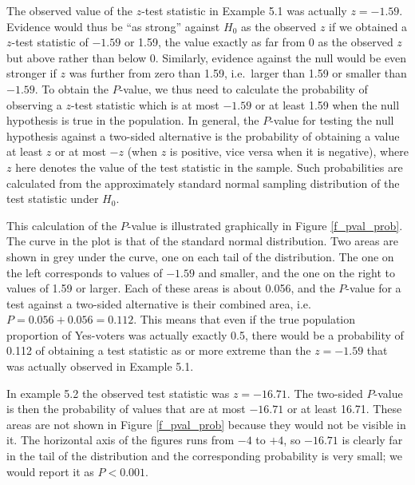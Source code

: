 The observed value of the $z$-test statistic in Example 5.1 was actually
$z=-1.59$. Evidence would thus be ``as strong'' against $H_{0}$ as the
observed $z$ if we obtained a $z$-test statistic of $-1.59$ or 1.59, the
value exactly as far from 0 as the observed $z$ but above rather than
below 0. Similarly, evidence against the null would be even stronger if
$z$ was further from zero than 1.59, i.e.\ larger than 1.59 or smaller
than $-1.59$. To obtain the $P$-value, we thus need to calculate the
probability of observing a $z$-test statistic which is at most $-1.59$
or at least 1.59 when the null hypothesis is true in the population. In
general, the $P$-value for testing the null hypothesis against a
two-sided alternative is the probability of obtaining a value at least
$z$ or at most $-z$ (when $z$ is positive, vice versa when it is
negative), where $z$ here denotes the value of the test statistic in the
sample. Such probabilities are calculated from the approximately
standard normal sampling distribution of the test statistic under
$H_{0}$.

This calculation of the $P$-value is illustrated graphically in Figure
\ref{f_pval_prob}. The curve in the plot is that of the standard normal
distribution. Two areas are shown in grey under the curve, one on each
tail of the distribution. The one on the left corresponds to values of
$-1.59$ and smaller, and the one on the right to values of 1.59 or
larger. Each of these areas is about 0.056, and the $P$-value for a test
against a two-sided alternative is their combined area, i.e.\
$P=0.056+0.056=0.112$. This means that even if the true population
proportion of Yes-voters was actually exactly 0.5, there would be a
probability of 0.112 of obtaining a test statistic as or more extreme
than the $z=-1.59$ that was actually observed in Example 5.1.

In example 5.2 the observed test statistic was $z=-16.71$. The
two-sided $P$-value is then the probability of values that are
at most $-16.71$ or at least 16.71. These areas are not shown in Figure
\ref{f_pval_prob} because they would not be visible in it. The horizontal
axis of the figures runs from $-4$ to $+4$, so $-16.71$ is clearly far
in the tail of the distribution and the corresponding probability is
very small; we would report it as $P<0.001$.

